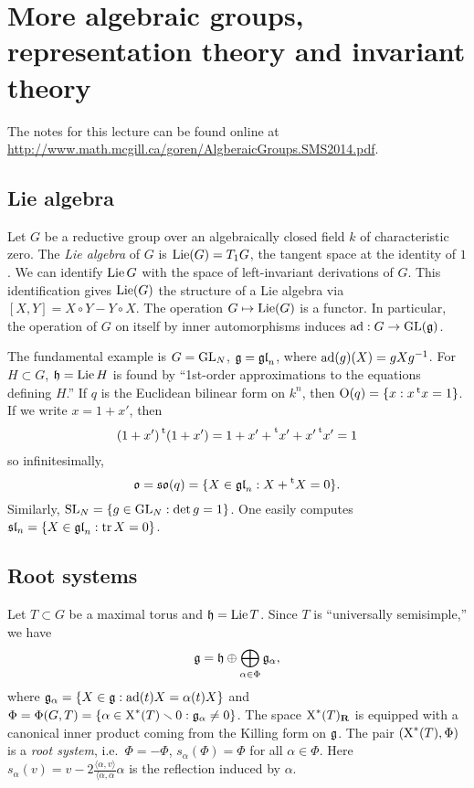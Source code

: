 
\section{More algebraic groups, representation theory and invariant theory}





The notes for this lecture can be found online at 
\url{http://www.math.mcgill.ca/goren/AlgberaicGroups.SMS2014.pdf}. 





\subsection{Lie algebra}

Let $G$ be a reductive group over an algebraically closed field $k$ of 
characteristic zero. The \emph{Lie algebra} of $G$ is 
$\operatorname{Lie}(G)=T_1 G$, the tangent space at the identity of $1$. We can identify 
$\operatorname{Lie} G$ with the space of left-invariant derivations of $G$. This 
identification gives $\operatorname{Lie}(G)$ the structure of a Lie algebra via 
$[X,Y]=X\circ Y-Y\circ X$. The operation $G\mapsto \operatorname{Lie}(G)$ is a 
functor. In particular, the operation of $G$ on itself by inner 
automorphisms induces $\operatorname{ad}:G\to \operatorname{GL}(\mathfrak{g})$. 

The fundamental example is $G=\operatorname{GL}_N$, 
$\mathfrak{g}=\mathfrak{gl}_n$, where $\operatorname{ad}(g)(X)=g X g^{-1}$. For 
$H\subset G$, $\mathfrak{h}=\operatorname{Lie} H$ is found by ``1st-order approximations to the 
equations defining $H$.'' If $q$ is the Euclidean bilinear form on 
$k^n$, then $\operatorname{O}(q) = \{x:x \prescript{\mathrm{t}}{}{x}=1\}$. If we write 
$x=1+x '$, then 
\[
  (1+x') \prescript{\mathrm{t}}{}{(}1+x') = 1+x' + \prescript{\mathrm{t}}{}{x'} + x' \prescript{\mathrm{t}}{}{x'} = 1
\]
so infinitesimally, 
\[
  \mathfrak o = \mathfrak{so}(q) = \{X\in \mathfrak{gl}_n:X+\prescript{\mathrm{t}}{}{X}=0\} .
\]
Similarly, $\operatorname{SL}_N=\{g\in \operatorname{GL}_N:\det g=1\}$. One easily 
computes $\mathfrak{sl}_n = \{X\in \mathfrak{gl}_n:\operatorname{tr} X=0\}$. 





\subsection{Root systems}

Let $T\subset G$ be a maximal torus and $\mathfrak{h}=\operatorname{Lie} T$. Since $T$ is 
``universally semisimple,'' we have 
\[
  \mathfrak{g} = \mathfrak{h}\oplus \bigoplus_{\alpha\in \Phi} \mathfrak{g}_\alpha,
\]
where $\mathfrak{g}_\alpha=\{X\in \mathfrak{g}:\operatorname{ad}(t) X = \alpha(t) X\}$ and 
$\Phi=\Phi(G,T)=\{\alpha\in \operatorname{X}^\ast(T)\smallsetminus 0:\mathfrak{g}_\alpha\ne 0\}$. 
The space $\operatorname{X}^\ast(T)_{\mathbf{R}}$ is equipped with a canonical inner product 
coming from the Killing form on $\mathfrak{g}$. The pair 
$(\operatorname{X}^\ast(T),\Phi)$ is a \emph{root system}, i.e.~$\Phi=-\Phi$, 
$s_\alpha(\Phi)=\Phi$ for all $\alpha\in \Phi$. Here 
$s_\alpha(v) = v-2\frac{\langle \alpha,v\rangle}{\langle \alpha,\alpha} \alpha$ 
is the reflection induced by $\alpha$. 

